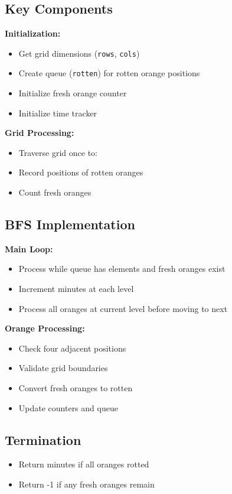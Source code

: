 \subsection*{Key Components}

\textbf{Initialization:}
\begin{itemize}
    \item Get grid dimensions (\texttt{rows}, \texttt{cols})
    \item Create queue (\texttt{rotten}) for rotten orange positions
    \item Initialize fresh orange counter
    \item Initialize time tracker
\end{itemize}

\textbf{Grid Processing:}
\begin{itemize}
    \item Traverse grid once to:
    \item Record positions of rotten oranges
    \item Count fresh oranges
\end{itemize}

\subsection*{BFS Implementation}

\textbf{Main Loop:}
\begin{itemize}
    \item Process while queue has elements and fresh oranges exist
    \item Increment minutes at each level
    \item Process all oranges at current level before moving to next
\end{itemize}

\textbf{Orange Processing:}
\begin{itemize}
    \item Check four adjacent positions
    \item Validate grid boundaries
    \item Convert fresh oranges to rotten
    \item Update counters and queue
\end{itemize}

\subsection*{Termination}
\begin{itemize}
    \item Return minutes if all oranges rotted
    \item Return -1 if any fresh oranges remain
\end{itemize}

